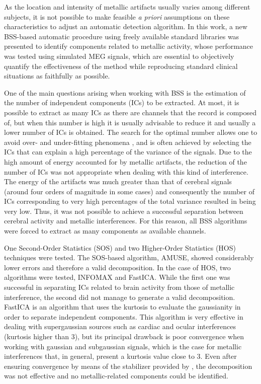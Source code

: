 As the location and intensity of metallic artifacts usually varies among different subjects, it is not possible to make feasible \textit{a priori} assumptions on these characteristics to adjust an automatic detection algorithm. In this work, a new BSS-based automatic procedure using freely available standard libraries was presented to identify components related to metallic activity, whose performance was tested using simulated MEG signals, which are essential to objectively quantify the effectiveness of the method while reproducing standard clinical situations as faithfully as possible.

One of the main questions arising when working with BSS is the estimation of the number of independent components (ICs) to be extracted. At most, it is possible to extract as many ICs as there are channels that the record is composed of, but when this number is high it is usually advisable to reduce it and usually a lower number of ICs is obtained. The search for the optimal number allows one to avoid over- and under-fitting phenomena \citep{Li2007},  and is often achieved by selecting the ICs that can explain a high percentage of the variance of the signals. Due to the high amount of energy accounted for by metallic artifacts, the reduction of the number of ICs was not appropriate when dealing with this kind of interference. The energy of the artifacts was much greater than that of cerebral signals (around four orders of magnitude in some cases) and consequently the number of ICs corresponding to very high percentages of the total variance resulted in being very low. Thus, it was not possible to achieve a successful separation between cerebral activity and metallic interferences. For this reason, all BSS algorithms were forced to extract as many components as available channels.

One Second-Order Statistics (SOS) and two Higher-Order Statistics (HOS) techniques were tested. The SOS-based algorithm, AMUSE, showed considerably lower errors and therefore a valid decomposition. In the case of HOS, two algorithms were tested, INFOMAX and FastICA. While the first one was successful in separating ICs related to brain activity from those of metallic interference, the second did not manage to generate a valid decomposition. FastICA is an algorithm that uses the kurtosis to evaluate the gaussianity in order to separate independent components. This algorithm is very effective in dealing with supergaussian sources such as cardiac and ocular interferences (kurtosis higher than 3), but its principal drawback is poor convergence when working with gaussian and subgaussian signals, which is the case for metallic interferences that, in general, present a kurtosis value close to 3. Even after ensuring convergence by means of the stabilizer provided by \citep{Hyvarinen1999}, the decomposition was not effective and no metallic-related components could be identified.

